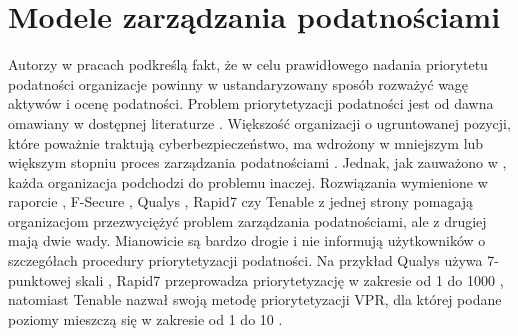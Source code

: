
\section{Modele zarządzania podatnościami}
\label{sec:modele-zarzadzaia-podatnosciami}
Autorzy w pracach \cite{fruhwirth2009improving, ali2011software} podkreślą fakt, że w celu prawidłowego nadania priorytetu podatności organizacje powinny w ustandaryzowany sposób rozważyć wagę aktywów i ocenę podatności. Problem priorytetyzacji podatności jest od dawna omawiany w dostępnej literaturze \cite{chen2007stakeholder, eschelbeck2005laws, lai2007using, rieke2006modelling}. Większość organizacji o ugruntowanej pozycji, które poważnie traktują cyberbezpieczeństwo, ma wdrożony w mniejszym lub większym stopniu proces zarządzania podatnościami \cite{Gartner-2020, chen2007stakeholder, fruhwirth2009improving}. Jednak, jak zauważono w \cite{Gartner-2020, chen2007stakeholder, eschelbeck2005laws, lai2007using, rieke2006modelling}, każda organizacja podchodzi do problemu inaczej. Rozwiązania wymienione w raporcie \cite{Gartner-vm}, F-Secure \cite{fsecure2021}, Qualys \cite{qualys2021}, Rapid7 \cite{rapid72021} czy Tenable \cite{tenablevm2021} z jednej strony pomagają organizacjom przezwyciężyć problem zarządzania podatnościami, ale z drugiej mają dwie wady. Mianowicie są bardzo drogie i nie informują użytkowników o szczegółach procedury priorytetyzacji podatności. Na przykład Qualys używa 7-punktowej skali \cite{qualys2021}, Rapid7 przeprowadza priorytetyzację w zakresie od 1 do 1000 \cite{rapid72021}, natomiast Tenable nazwał swoją metodę priorytetyzacji VPR, dla której podane poziomy mieszczą się w zakresie od 1 do 10 \cite{tenablevm2021}.

